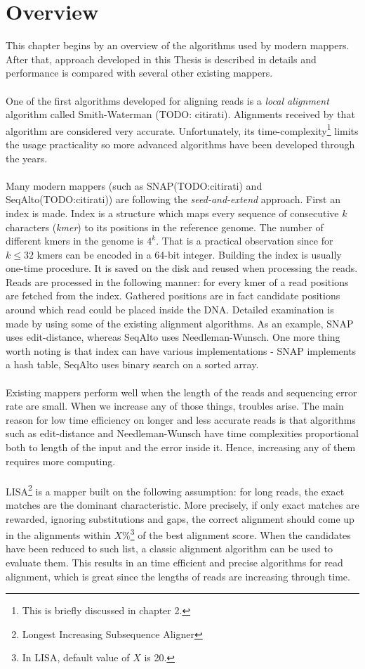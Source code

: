 \documentclass[times, utf8, diplomski]{fer}
\begin{document}
\section{Overview}
This chapter begins by an overview of the algorithms used by modern mappers. After that, approach developed in this Thesis is described in details and performance is compared with several other existing mappers.\\
\\
One of the first algorithms developed for aligning reads is a \emph{local alignment} algorithm called Smith-Waterman (TODO: citirati). Alignments received by that algorithm are considered very accurate. Unfortunately, its time-complexity\footnote{This is briefly discussed in chapter 2.} limits the usage practicality so more advanced algorithms have been developed through the years.\\
\\
Many modern mappers (such as SNAP(TODO:citirati) and SeqAlto(TODO:citirati)) are following the \emph{seed-and-extend} approach. First an index is made. Index is a structure which maps every sequence of consecutive $k$ characters (\emph{kmer}) to its positions in the reference genome. The number of different kmers in the genome is $4^k$. That is a practical observation since for $k \le 32$ kmers can be encoded in a 64-bit integer. Building the index is usually one-time procedure. It is saved on the disk and reused when processing the reads. Reads are processed in the following manner: for every kmer of a read positions are fetched from the index. Gathered positions are in fact candidate positions around which read could be placed inside the DNA. Detailed examination is made by using some of the existing alignment algorithms. As an example, SNAP uses edit-distance, whereas SeqAlto uses Needleman-Wunsch. One more thing worth noting is that index can have various implementations - SNAP implements a hash table, SeqAlto uses binary search on a sorted array.\\
\\
Existing mappers perform well when the length of the reads and sequencing error rate are small. When we increase any of those things, troubles arise. The main reason for low time efficiency on longer and less accurate reads is that algorithms such as edit-distance and Needleman-Wunsch have time complexities proportional both to length of the input and the error inside it. Hence, increasing any of them requires more computing.\\
\\
LISA\footnote{Longest Increasing Subsequence Aligner} is a mapper built on the following assumption: for long reads, the exact matches are the dominant characteristic. More precisely, if only exact matches are rewarded, ignoring substitutions and gaps, the correct alignment should come up in the alignments within $X\%$\footnote{In LISA, default value of $X$ is 20.} of the best alignment score. When the candidates have been reduced to such list, a classic alignment algorithm can be used to evaluate them. This results in an time efficient and precise algorithms for read alignment, which is great since the lengths of reads are increasing through time.
\end{document}
